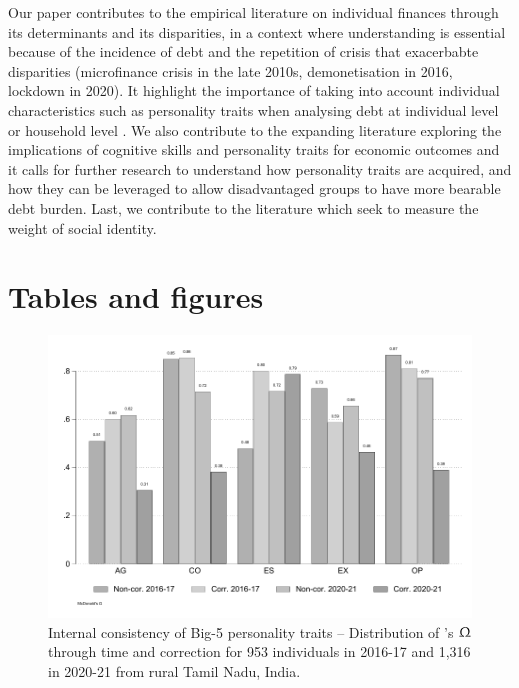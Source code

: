 \documentclass[a4paper, 11pt, onecolumn]{article}
\begin{document}
Our paper contributes to the empirical literature on individual finances through its determinants and its disparities, in a context where understanding is essential because of the incidence of debt and the repetition of crisis that exacerbabte disparities (microfinance crisis in the late 2010s, demonetisation in 2016, lockdown in 2020).
It highlight the importance of taking into account individual characteristics such as personality traits when analysing debt at individual level or household level \citep{Brown2014}.
We also contribute to the expanding literature exploring the implications of cognitive skills and personality traits for economic outcomes and it calls for further research to understand how personality traits are acquired, and how they can be leveraged to allow disadvantaged groups to have more bearable debt burden.
Last, we contribute to the literature which seek to measure the weight of social identity.




\clearpage
\newpage
%








\clearpage
\newpage
\section*{Tables and figures}

\begin{figure}[!h]
\raggedright
\includegraphics[scale=0.8]{INPUT/omega}
\caption{Internal consistency of Big-5 personality traits -- Distribution of \citeauthor{McDonald1999}'s $\Upomega$ through time and correction for 953 individuals in 2016-17 and 1,316 in 2020-21 from rural Tamil Nadu, India.}
\label{fig:omega}
\end{figure}
\end{document}
